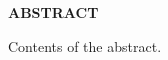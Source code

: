 \begin{titlepage}
    \begin{center}
        {\Large \Large \bf {ABSTRACT} }
    \end{center}
    
    Contents of the abstract.

\end{titlepage}
